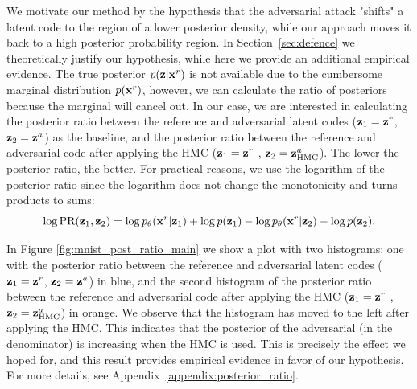 We motivate our method by the hypothesis that the adversarial attack "shifts" a latent code to the region of a lower posterior density, while our approach moves it back to a high posterior probability region. In Section~\ref{sec:defence} we theoretically justify our hypothesis, while here we provide an additional empirical evidence.
The true posterior $p({\mathbf{z}} | {\mathbf{x}}^{r})$ is not available due to the cumbersome marginal distribution $p({\mathbf{x}}^{r})$, however, we can calculate the ratio of posteriors because the marginal will cancel out. In our case, we are interested in calculating the posterior ratio between the reference and adversarial latent codes (${\mathbf{z}}_1 = {\mathbf{z}}^r$,  ${\mathbf{z}}_2 = {\mathbf{z}}^a$) as the baseline, and the posterior ratio between the reference and adversarial code after applying the HMC (${\mathbf{z}}_1 = {\mathbf{z}}^r$ , ${\mathbf{z}}_2 = {\mathbf{z}}^a_{\text{HMC}}$). The lower the posterior ratio, the better. For practical reasons, we use the logarithm of the posterior ratio since the logarithm does not change the monotonicity and turns products to sums:
\begin{equation}
    \log \text{PR}({\mathbf{z}}_1, {\mathbf{z}}_2) = \log p_{\theta}({\mathbf{x}}^r|{\mathbf{z}}_1) + \log p({\mathbf{z}}_1) - \log p_{\theta}({\mathbf{x}}^r| {\mathbf{z}}_2) - \log p({\mathbf{z}}_2) .
\end{equation}

In Figure \ref{fig:mnist_post_ratio_main} we show a plot with two histograms: one with the posterior ratio between the reference and adversarial latent codes (${\mathbf{z}}_1 = {\mathbf{z}}^r$,  ${\mathbf{z}}_2 = {\mathbf{z}}^a$) in blue, and the second histogram of the posterior ratio between the reference and adversarial code after applying the HMC (${\mathbf{z}}_1 = {\mathbf{z}}^r$ , ${\mathbf{z}}_2 = {\mathbf{z}}^a_{\text{HMC}}$) in orange. We observe that the histogram has moved to the left after applying the HMC. This indicates that the posterior of the adversarial (in the denominator) is increasing when the HMC is used. This is precisely the effect we hoped for, and this result provides empirical evidence in favor of our hypothesis. For more details, see Appendix~\ref{appendix:posterior_ratio}.


